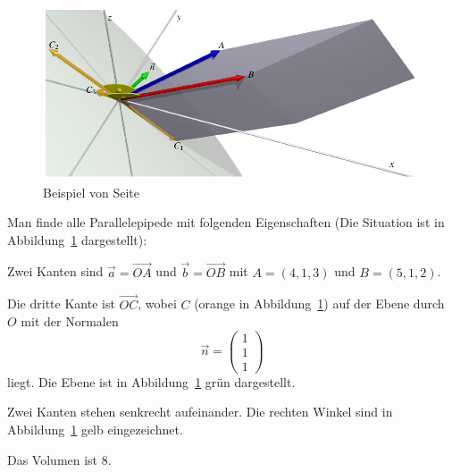 \begin{beispiel}
\label{skript:orientierung:beispiel}
\begin{figure}
\centering
\includegraphics{5/images/beispiel.pdf}
\caption{Beispiel von Seite~\pageref{skript:orientierung:beispiel}
\label{skript:orientierung:beispiel:abb}}
\end{figure}
Man finde alle Parallelepipede mit folgenden Eigenschaften
(Die Situation ist in Abbildung~\ref{skript:orientierung:beispiel:abb}
dargestellt):
\begin{compactenum}
\item Zwei Kanten sind $\vec a=\overrightarrow{OA}$ und
$\vec b=\overrightarrow{OB}$ mit $A=(4,1,3)$ und $B=(5,1,2)$.
\item Die dritte Kante ist $\overrightarrow{OC}$, wobei $C$ (orange in
Abbildung~\ref{skript:orientierung:beispiel:abb})
auf der
Ebene durch $O$ mit der Normalen
\[
\vec n=\begin{pmatrix}1\\1\\1\end{pmatrix}
\]
liegt.
Die Ebene ist in 
Abbildung~\ref{skript:orientierung:beispiel:abb}
grün dargestellt.
\item Zwei Kanten stehen senkrecht aufeinander.
Die rechten Winkel sind in
Abbildung~\ref{skript:orientierung:beispiel:abb}
gelb eingezeichnet.
\item Das Volumen ist $8$.
\end{compactenum}

\smallskip


\end{beispiel}
